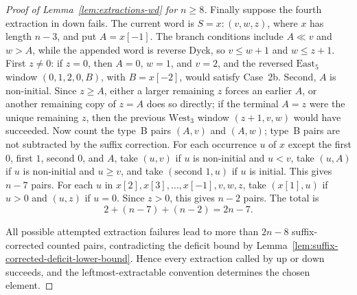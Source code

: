 \documentclass[11pt]{article}
\theoremstyle{plain}
\theoremstyle{definition}
\theoremstyle{remark}
\begin{document}
\begin{proof}[Proof of Lemma~\ref{lem:extractions-wd} for \(n\ge 8\)]
Finally suppose the fourth extraction in \(\mathrm{down}\) fails.  The current
word is \(S=x:(v,w,z)\), where \(x\) has length \(n-3\), and put
\(A=x[-1]\).  The branch conditions include \(A\ll v\) and \(w>A\), while the
appended word is reverse Dyck, so \(v\le w+1\) and \(w\le z+1\).  First
\(z\ne0\): if \(z=0\), then \(A=0\), \(w=1\), and \(v=2\), and the reversed
\(\mathrm{East}_5\) window \((0,1,2,0,B)\), with \(B=x[-2]\), would satisfy
Case~2b.  Second, \(A\) is non-initial.  Since \(z\ge A\), either a larger
remaining \(z\) forces an earlier \(A\), or another remaining copy of \(z=A\)
does so directly; if the terminal \(A=z\) were the unique remaining \(z\), then
the previous \(\mathrm{West}_3\) window \((z+1,v,w)\) would have succeeded.
Now count the type~B pairs \((A,v)\) and \((A,w)\); type~B pairs are not
subtracted by the suffix correction.  For each
occurrence \(u\) of \(x\) except the first \(0\), first \(1\), second \(0\),
and \(A\), take \((u,v)\) if \(u\) is non-initial and \(u<v\), take \((u,A)\)
if \(u\) is non-initial and \(u\ge v\), and take \((\text{second }1,u)\) if
\(u\) is initial.  This gives \(n-7\) pairs.  For each \(u\) in
\(x[2],x[3],\ldots,x[-1],v,w,z\), take \((x[1],u)\) if \(u>0\) and \((u,z)\)
if \(u=0\).  Since \(z>0\), this gives \(n-2\) pairs.  The total is
\[
  2+(n-7)+(n-2)=2n-7.
\]

All possible attempted extraction failures lead to more than \(2n-8\)
suffix-corrected counted pairs, contradicting the deficit bound by
Lemma~\ref{lem:suffix-corrected-deficit-lower-bound}.  Hence every extraction
called by \(\mathrm{up}\) or \(\mathrm{down}\) succeeds, and the
leftmost-extractable convention determines the chosen element.
\end{proof}

\end{document}
